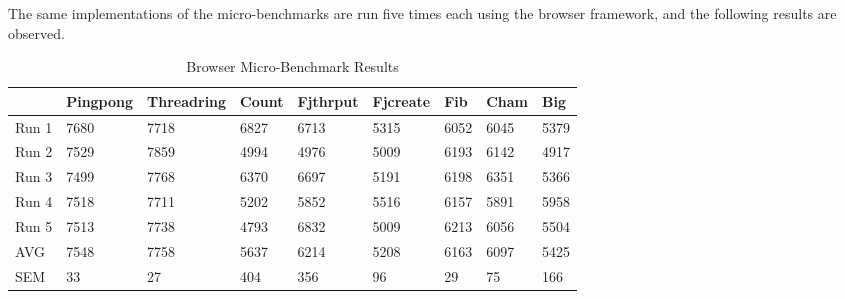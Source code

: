 \documentclass[oneside]{um-fict}
\begin{document}
The same implementations of the micro-benchmarks are run five times each using the browser framework, and the following results are observed.
\begin{table}[H]
    \begin{center}
        \begin{tabular}{|l|llllllll|}
        \hline
            & Pingpong & Threadring & Count  & Fjthrput & Fjcreate & Fib    & Cham & Big    \\ \hline
        Run 1 & 7680     & 7718       & 6827   & 6713     & 5315     & 6052   & 6045      & 5379   \\
        Run 2 & 7529     & 7859       & 4994   & 4976     & 5009     & 6193   & 6142      & 4917   \\
        Run 3 & 7499     & 7768       & 6370   & 6697     & 5191     & 6198   & 6351      & 5366   \\
        Run 4 & 7518     & 7711       & 5202   & 5852     & 5516     & 6157   & 5891      & 5958   \\
        Run 5 & 7513     & 7738       & 4793   & 6832     & 5009     & 6213   & 6056      & 5504   \\ \hline
        AVG   & 7548   & 7758     & 5637 & 6214     & 5208     & 6163 & 6097      & 5425 \\
        SEM   & 33     & 27       & 404 & 356   & 96    & 29  & 75     & 166 \\ \hline
        \end{tabular}
        \caption{Browser Micro-Benchmark Results}\label{tab:browsermicro}
    \end{center}
\end{table}
\end{document}
